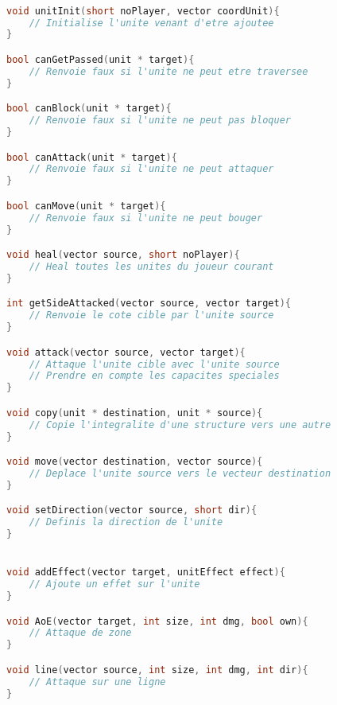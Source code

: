 \documentclass[a4paper,10pt]{extreport}
\begin{document}
\begin{lstlisting}[language=c]

void unitInit(short noPlayer, vector coordUnit){
	// Initialise l'unite venant d'etre ajoutee
}

bool canGetPassed(unit * target){
	// Renvoie faux si l'unite ne peut etre traversee
}

bool canBlock(unit * target){
	// Renvoie faux si l'unite ne peut pas bloquer
}

bool canAttack(unit * target){
	// Renvoie faux si l'unite ne peut attaquer
}

bool canMove(unit * target){
	// Renvoie faux si l'unite ne peut bouger
}

void heal(vector source, short noPlayer){
	// Heal toutes les unites du joueur courant
}

int getSideAttacked(vector source, vector target){
	// Renvoie le cote cible par l'unite source
}

void attack(vector source, vector target){
	// Attaque l'unite cible avec l'unite source
	// Prendre en compte les capacites speciales
}

void copy(unit * destination, unit * source){
	// Copie l'integralite d'une structure vers une autre
}

void move(vector destination, vector source){
	// Deplace l'unite source vers le vecteur destination
}

void setDirection(vector source, short dir){
	// Definis la direction de l'unite
}


void addEffect(vector target, unitEffect effect){
	// Ajoute un effet sur l'unite
}

void AoE(vector target, int size, int dmg, bool own){
	// Attaque de zone
}

void line(vector source, int size, int dmg, int dir){
	// Attaque sur une ligne
}

\end{lstlisting}
\end{document}
